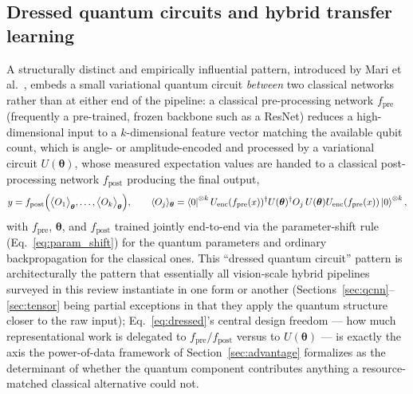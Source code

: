 \documentclass[11pt]{article}
\begin{document}
\subsection{Dressed quantum circuits and hybrid transfer learning}
A structurally distinct and empirically influential pattern, introduced by Mari et al.\ \cite{Mari2020}, embeds a small variational quantum circuit \emph{between} two classical networks rather than at either end of the pipeline: a classical pre-processing network $f_{\text{pre}}$ (frequently a pre-trained, frozen backbone such as a ResNet) reduces a high-dimensional input to a $k$-dimensional feature vector matching the available qubit count, which is angle- or amplitude-encoded and processed by a variational circuit $U(\bm{\theta})$, whose measured expectation values are handed to a classical post-processing network $f_{\text{post}}$ producing the final output,
\begin{equation}
y = f_{\text{post}}\Bigl(\bigl\langle O_1\bigr\rangle_{\bm{\theta}},\ldots,\bigl\langle O_k\bigr\rangle_{\bm{\theta}}\Bigr), \qquad \langle O_j\rangle_{\bm{\theta}} = \bra{0}^{\otimes k} U_{\text{enc}}(f_{\text{pre}}(x))^\dagger U(\bm{\theta})^\dagger O_j\, U(\bm{\theta}) U_{\text{enc}}(f_{\text{pre}}(x))\ket{0}^{\otimes k},
\label{eq:dressed}
\end{equation}
with $f_{\text{pre}}$, $\bm{\theta}$, and $f_{\text{post}}$ trained jointly end-to-end via the parameter-shift rule (Eq.~\eqref{eq:param_shift}) for the quantum parameters and ordinary backpropagation for the classical ones. This ``dressed quantum circuit'' pattern is architecturally the pattern that essentially all vision-scale hybrid pipelines surveyed in this review instantiate in one form or another (Sections~\ref{sec:qcnn}--\ref{sec:tensor} being partial exceptions in that they apply the quantum structure closer to the raw input); Eq.~\eqref{eq:dressed}'s central design freedom — how much representational work is delegated to $f_{\text{pre}}/f_{\text{post}}$ versus to $U(\bm{\theta})$ — is exactly the axis the power-of-data framework of Section~\ref{sec:advantage} formalizes as the determinant of whether the quantum component contributes anything a resource-matched classical alternative could not.
\end{document}
